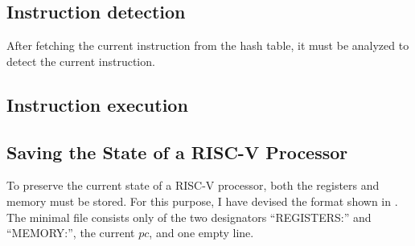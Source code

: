 

\subsection{Instruction detection}
After fetching the current instruction from the hash table, it must
be analyzed to detect the current instruction.

\subsection{Instruction execution}

\subsection{Saving the State of a RISC-V
      Processor}\label{sub:statefile}

To preserve the current state of a RISC-V processor, both the
registers and memory must be stored. For this purpose, I have devised
the format shown in . The minimal file consists
only of the two designators \enquote{REGISTERS:} and
\enquote{MEMORY:}, the current $pc$, and one empty line.

